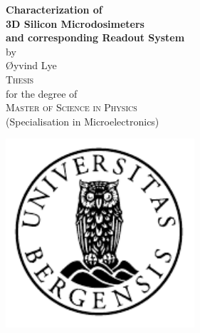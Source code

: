 \documentclass[12pt, a4paper]{report}
\begin{document}
\maketitle

\newcommand{\blankpage}{\newpage{}\thispagestyle{empty}\mbox{}\newpage{}}
\newcommand{\HRule}{\rule{\linewidth}{0.5mm}}



\begin{titlepage}
\begin{center}
 \Huge {\bfseries Characterization of\vspace{-2mm} \\3D Silicon Microdosimeters\vspace{-2mm} \\and corresponding Readout System}\\[1cm]

\large by\\ \Large Øyvind Lye\\[1.6cm]

\textsc{\Large Thesis}\\
\large for the degree of\\
\textsc{\Large Master of Science in Physics}\\[0.5cm]
\large (Specialisation in Microelectronics) \\%


\end{center}
\vfill
\begin{center}
{
	\includegraphics[width=7cm]{uib-emblem-svart}\\[0.5cm]
	
}
\end{center}
\end{titlepage}
\end{document}
